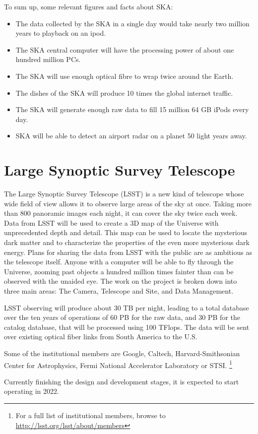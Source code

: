 To sum up, some relevant figures and facts about SKA:

\begin{itemize}

\item The data collected by the SKA in a single day would take nearly two million years to playback on an ipod.
\item The SKA central computer will have the processing power of about one hundred million PCs.
\item The SKA will use enough optical fibre to wrap twice around the Earth.
\item The dishes of the SKA will produce 10 times the global internet traffic.
\item The SKA will generate enough raw data to fill 15 million 64 GB iPods every day.
\item SKA will be able to detect an airport radar on a planet 50 light years away.

\end{itemize}



\section{Large Synoptic Survey Telescope}

The Large Synoptic Survey Telescope (LSST) is a new kind of telescope whose wide field of view allows it to observe large areas of the sky at once. Taking more than 800 panoramic images each night, it can cover the sky twice each week. Data from LSST will be used to create a 3D map of the Universe with unprecedented depth and detail. This map can be used to locate the mysterious dark matter and to characterize the properties of the even more mysterious dark energy. Plans for sharing the data from LSST with the public are as ambitious as the telescope itself. Anyone with a computer will be able to fly through the Universe, zooming past objects a hundred million times fainter than can be observed with the unaided eye. The work on the project is broken down into three main areas: The Camera, Telescope and Site, and Data Management. \newline

LSST observing will produce about 30 TB per night, leading to a total database over the ten years of operations of 60 PB for the raw data, and 30 PB for the catalog database, that will be processed using 100 TFlops. The data will be sent over existing optical fiber links from South America to the U.S. \newline

Some of the institutional members are Google, Caltech, Harvard-Smithsonian Center for Astrophysics, Fermi National Accelerator Laboratory or STSI. \footnote{For a full list of institutional members, browse to \url{http://lsst.org/lsst/about/members}}  \newline

Currently finishing the design and development stages, it is expected to start operating in 2022.